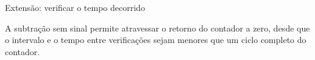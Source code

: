 \begin{frame}[fragile,t]{Extensão: verificar o tempo decorrido}

\small A subtração sem sinal permite atravessar o retorno do contador a zero, desde que o intervalo e o tempo entre verificações sejam menores que um ciclo completo do contador.
\end{frame}
